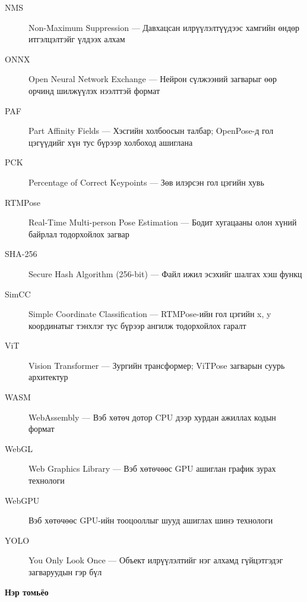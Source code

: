 \begin{description}
\item[NMS] Non-Maximum Suppression --- Давхацсан илрүүлэлтүүдээс хамгийн өндөр итгэлцэлтэйг үлдээх алхам
\item[ONNX] Open Neural Network Exchange --- Нейрон сүлжээний загварыг өөр орчинд шилжүүлэх нээлттэй формат
\item[PAF] Part Affinity Fields --- Хэсгийн холбоосын талбар; OpenPose-д гол цэгүүдийг хүн тус бүрээр холбоход ашиглана
\item[PCK] Percentage of Correct Keypoints --- Зөв илэрсэн гол цэгийн хувь
\item[RTMPose] Real-Time Multi-person Pose Estimation --- Бодит хугацааны олон хүний байрлал тодорхойлох загвар
\item[SHA-256] Secure Hash Algorithm (256-bit) --- Файл ижил эсэхийг шалгах хэш функц
\item[SimCC] Simple Coordinate Classification --- RTMPose-ийн гол цэгийн x, y координатыг тэнхлэг тус бүрээр ангилж тодорхойлох гаралт
\item[ViT] Vision Transformer --- Зургийн трансформер; ViTPose загварын суурь архитектур
\item[WASM] WebAssembly --- Вэб хөтөч дотор CPU дээр хурдан ажиллах кодын формат
\item[WebGL] Web Graphics Library --- Вэб хөтөчөөс GPU ашиглан график зурах технологи
\item[WebGPU]Вэб хөтөчөөс GPU-ийн тооцооллыг шууд ашиглах шинэ технологи
\item[YOLO] You Only Look Once --- Объект илрүүлэлтийг нэг алхамд гүйцэтгэдэг загваруудын гэр бүл
\end{description}

\noindent\textbf{Нэр томьёо}

